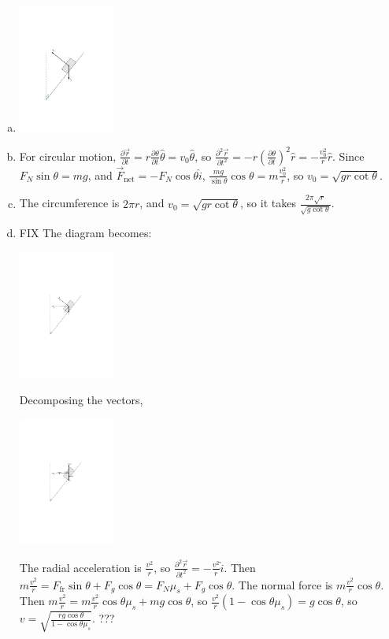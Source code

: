 \documentclass{esg8012pset}
\begin{document}
\begin{solution}
  \begin{enumerate}[a)]
    \item \hfil\includegraphics[width=0.25\textwidth]{2009-09-25_Diagram_3}\hfil
    \item For circular motion, $\frac{\partial \vec r}{\partial t} = r\frac{\partial \theta}{\partial t}\hat \theta = v_0 \hat \theta$, so $\frac{\partial^2 \vec r}{\partial t^2} = -r\left(\frac{\partial \theta}{\partial t}\right)^2\hat r = -\frac{v_0^2}{r}\hat r$.  Since $F_N\sin\theta = mg$, and $\vec F_{\text{net}} = -F_N\cos\theta\hat i$, $\frac{mg}{\sin\theta}\cos\theta = m\frac{v_0^2}{r}$, so $v_0 = \sqrt{gr\cot\theta}$.
    \item The circumference is $2\pi r$, and $v_0 = \sqrt{gr\cot\theta}$, so it takes $\frac{2\pi\sqrt{r}}{\sqrt{g\cot\theta}}$.
    \item FIX The diagram becomes: \begin{center}\includegraphics[width=0.25\textwidth]{2009-09-25_Diagram_8}\end{center}  Decomposing the vectors, \begin{center}\includegraphics[width=0.25\textwidth]{2009-09-25_Diagram_9}\end{center}  The radial acceleration is $\frac{v^2}{r}$, so $\frac{\partial^2 \vec r}{\partial t^2} = -\frac{v^2}{r}\hat i$.  Then $m\frac{v^2}{r} = F_{\text{fr}}\sin\theta + F_g\cos\theta = F_N \mu_s + F_g\cos\theta$.  The normal force is $m\frac{v^2}{r}\cos\theta$.  Then $m\frac{v^2}{r} = m\frac{v^2}{r}\cos\theta \mu_s + mg\cos\theta$, so $\frac{v^2}{r}(1 - \cos\theta \mu_s) = g\cos\theta$, so $v = \sqrt{\frac{rg\cos\theta}{1-\cos\theta\mu_s}}$. ???
  \end{enumerate}
\end{solution}
\end{document}
